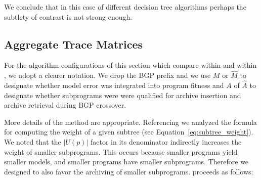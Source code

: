 %
%
%
%
%
%
We conclude that in this case of different decision tree algorithms perhaps the subtlety of contrast is not strong enough.  

\subsection{Aggregate Trace Matrices}\label{sect:agg-features}
For the algorithm configurations of this section which compare within \FULL and within \DRAW, we adopt a clearer notation. We drop the BGP prefix and we use $M$ or $\hat M$ to designate whether model error was integrated into program fitness and $A$ of $\hat A$ to designate whether subprograms were were qualified for archive insertion and archive retrieval during BGP crossover.

More details of the \DRAW method are appropriate.  Referencing \cite{krawiecGecco2014} we analyzed the formula for computing the weight of a given subtree (see Equation~\ref{eq:subtree_weight}).  We noted that the $|U(p)|$ factor in its denominator indirectly increases the weight of smaller subprograms.  This occurs because smaller programs yield smaller models, and smaller programs have smaller subprograms.  Therefore we designed \DRAW to also favor the archiving of smaller subprograms.  \DRAW proceeds as follows:

